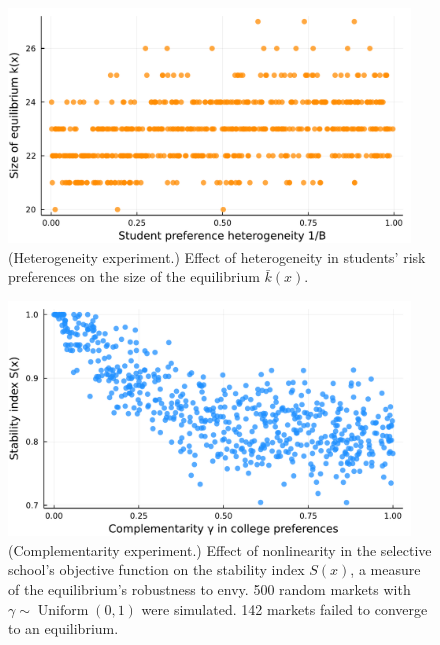 \documentclass[12pt]{article} %
\theoremstyle{definition}
\theoremstyle{definition}
\begin{document}
\begin{figure}[h!]
  \begin{center}\includegraphics[width=0.95\textwidth]{./TwoSchoolModels/CombiPref-complementarity/heterogeneity-k.pdf}\end{center}
  \caption{(Heterogeneity experiment.) Effect of heterogeneity in students' risk preferences on the size of the equilibrium $\bar k(x)$.}
\end{figure}

\begin{figure}[h!]
  \begin{center}\includegraphics[width=0.95\textwidth]{./TwoSchoolModels/CombiPref-complementarity/complementarity-S.pdf}\end{center}
  \caption{(Complementarity experiment.) Effect of nonlinearity in the selective school's objective function on the stability index $S(x)$, a measure of the equilibrium's robustness to envy. 500 random markets with $\gamma \sim \operatorname{Uniform}(0, 1)$ were simulated. 142 markets failed to converge to an equilibrium. }
\end{figure}
\end{document}
